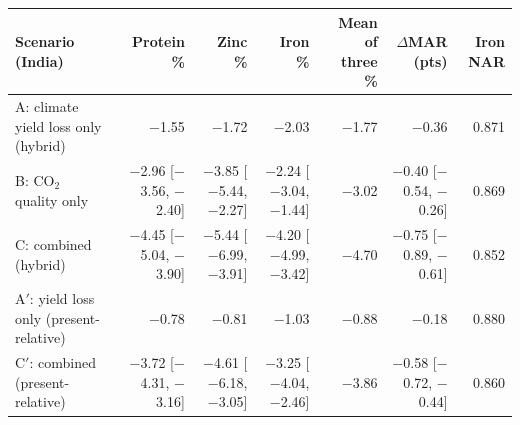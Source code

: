 \begin{tabular}{@{}lrrrrrr@{}}
\toprule
Scenario (India) & Protein \% & Zinc \% & Iron \% & Mean of three \% & $\Delta$MAR (pts) & Iron NAR \\
\midrule
A: climate yield loss only (hybrid) & $-$1.55 & $-$1.72 & $-$2.03 & $-$1.77 & $-$0.36 & 0.871 \\
B: CO$_2$ quality only & $-$2.96 [$-$3.56, $-$2.40] & $-$3.85 [$-$5.44, $-$2.27] & $-$2.24 [$-$3.04, $-$1.44] & $-$3.02 & $-$0.40 [$-$0.54, $-$0.26] & 0.869 \\
C: combined (hybrid) & $-$4.45 [$-$5.04, $-$3.90] & $-$5.44 [$-$6.99, $-$3.91] & $-$4.20 [$-$4.99, $-$3.42] & $-$4.70 & $-$0.75 [$-$0.89, $-$0.61] & 0.852 \\
A$'$: yield loss only (present-relative) & $-$0.78 & $-$0.81 & $-$1.03 & $-$0.88 & $-$0.18 & 0.880 \\
C$'$: combined (present-relative) & $-$3.72 [$-$4.31, $-$3.16] & $-$4.61 [$-$6.18, $-$3.05] & $-$3.25 [$-$4.04, $-$2.46] & $-$3.86 & $-$0.58 [$-$0.72, $-$0.44] & 0.860 \\
\bottomrule
\end{tabular}
